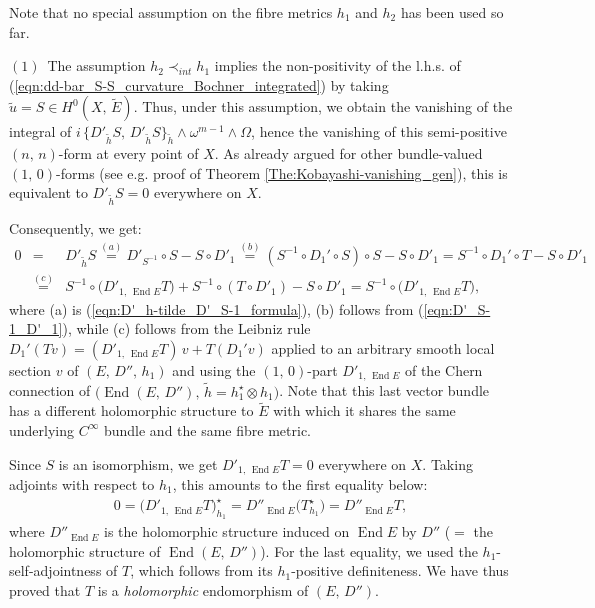 \documentclass[12pt]{article}
\begin{document}
Note that no special assumption on the fibre metrics $h_1$ and $h_2$ has been used so far. 


\vspace{1ex}

$(1)$\, The assumption $h_2\prec_{int} h_1$ implies the non-positivity of the l.h.s. of (\ref{eqn:dd-bar_S-S_curvature_Bochner_integrated}) by taking $\widetilde{u} = S\in H^0(X,\,\widetilde{E})$. Thus, under this assumption, we obtain the vanishing of the integral of $i\,\{D'_{\widetilde{h}}S,\,D'_{\widetilde{h}}S\}_{\widetilde{h}}\wedge\omega^{m-1}\wedge\Omega$, hence the vanishing of this semi-positive $(n,\,n)$-form at every point of $X$. As already argued for other bundle-valued $(1,\,0)$-forms (see e.g. proof of Theorem \ref{The:Kobayashi-vanishing_gen}), this is equivalent to $D'_{\widetilde{h}} S =0$ everywhere on $X$.

Consequently, we get: \begin{eqnarray*}0 & = & D'_{\widetilde{h}} S \stackrel{(a)}{=} D'_{S^{-1}}\circ S - S\circ D'_1 \stackrel{(b)}{=} (S^{-1}\circ D_1'\circ S)\circ S - S\circ D'_1 = S^{-1}\circ D_1'\circ T - S\circ D'_1 \\
 & \stackrel{(c)}{=} & S^{-1}\circ\bigg(D'_{1,\,\operatorname{End}E}T\bigg) + S^{-1}\circ(T\circ D'_1)  - S\circ D'_1 = S^{-1}\circ\bigg(D'_{1,\,\operatorname{End}E}T\bigg),\end{eqnarray*} where (a) is (\ref{eqn:D'_h-tilde_D'_S-1_formula}), (b) follows from (\ref{eqn:D'_S-1_D'_1}), while (c) follows from the Leibniz rule $D_1'(Tv) = (D'_{1,\,\operatorname{End}E}T)\,v + T(D_1'v)$ applied to an arbitrary smooth local
section $v$ of $(E,\,D'',\,h_1)$ and using the $(1,\,0)$-part $D'_{1,\,\operatorname{End}E}$ of the Chern connection of $\bigg(\operatorname{End}(E,\,D''),\,\widetilde{h}=h_1^\star\otimes h_1\bigg)$. Note that this last vector bundle has a different holomorphic structure to $\widetilde{E}$ with which it shares the same underlying $C^\infty$ bundle and the same fibre metric.

Since $S$ is an isomorphism, we get $D'_{1,\,\operatorname{End}E}T=0$ everywhere on $X$. Taking adjoints with respect to $h_1$, this amounts to the first equality below: \begin{eqnarray*}0 = \bigg(D'_{1,\,\operatorname{End}E}T\bigg)^\star_{h_1} = D''_{\operatorname{End}E}\bigg(T^\star_{h_1}\bigg) = D''_{\operatorname{End}E}T,\end{eqnarray*} where $D''_{\operatorname{End}E}$ is the holomorphic structure induced on $\operatorname{End}E$ by $D''$ ($=$ the holomorphic structure of $\operatorname{End}(E,\,D'')$). For the last equality, we used the $h_1$-self-adjointness of $T$, which follows from its $h_1$-positive definiteness. We have thus proved that $T$ is a {\it holomorphic} endomorphism of $(E,\,D'')$.
\end{document}
